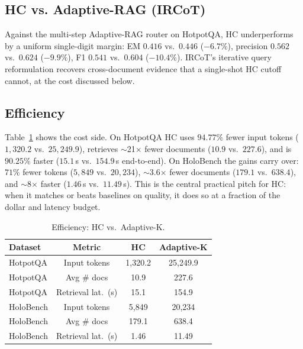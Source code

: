 \documentclass[letterpaper]{article}
\newcommand{\HotEMHC}{0.416}
\newcommand{\HotEMIRCoT}{0.446}
\newcommand{\HotPrecHC}{0.562}
\newcommand{\HotPrecIRCoT}{0.624}
\newcommand{\HotFOneHC}{0.541}
\newcommand{\HotFOneIRCoT}{0.604}
\newcommand{\HotTokHC}{1{,}320.2}
\newcommand{\HotTokAdaK}{25{,}249.9}
\newcommand{\HotDocsHC}{10.9}
\newcommand{\HotDocsAdaK}{227.6}
\newcommand{\HotLatHC}{15.1}
\newcommand{\HotLatAdaK}{154.9}
\newcommand{\HolTokHC}{5{,}849}
\newcommand{\HolTokAdaK}{20{,}234}
\newcommand{\HolDocsHC}{179.1}
\newcommand{\HolDocsAdaK}{638.4}
\newcommand{\HolLatHC}{1.46}
\newcommand{\HolLatAdaK}{11.49}
\begin{document}
\subsection{HC vs. Adaptive-RAG (IRCoT)}
Against the multi-step Adaptive-RAG router on HotpotQA, HC
underperforms by a uniform single-digit margin: EM $\HotEMHC$ vs.\
$\HotEMIRCoT$ ($-6.7\%$), precision $\HotPrecHC$ vs.\
$\HotPrecIRCoT$ ($-9.9\%$), F1 $\HotFOneHC$ vs.\ $\HotFOneIRCoT$
($-10.4\%$). IRCoT's iterative query reformulation recovers
cross-document evidence that a single-shot HC cutoff cannot, at the
cost discussed below.

\subsection{Efficiency}
Table~\ref{tab:eff} shows the cost side. On HotpotQA HC uses
$94.77\%$ fewer input tokens ($\HotTokHC$ vs.\ $\HotTokAdaK$),
retrieves $\sim$21$\times$ fewer documents ($\HotDocsHC$ vs.\
$\HotDocsAdaK$), and is $90.25\%$ faster ($\HotLatHC$\,s vs.\
$\HotLatAdaK$\,s end-to-end). On HoloBench the gains carry over:
$71\%$ fewer tokens ($\HolTokHC$ vs.\ $\HolTokAdaK$), $\sim$3.6$\times$
fewer documents ($\HolDocsHC$ vs.\ $\HolDocsAdaK$), and $\sim$8$\times$
faster ($\HolLatHC$\,s vs.\ $\HolLatAdaK$\,s). This is the central
practical pitch for HC: when it matches or beats baselines on quality,
it does so at a fraction of the dollar and latency budget.

\begin{table}[t]
\centering
\small
\begin{tabular}{lccc}
\hline
Dataset & Metric & HC & Adaptive-K \\
\hline
HotpotQA  & Input tokens     & \HotTokHC  & \HotTokAdaK \\
HotpotQA  & Avg \# docs      & \HotDocsHC & \HotDocsAdaK \\
HotpotQA  & Retrieval lat.\ (s) & \HotLatHC  & \HotLatAdaK \\
\hline
HoloBench & Input tokens     & \HolTokHC  & \HolTokAdaK \\
HoloBench & Avg \# docs      & \HolDocsHC & \HolDocsAdaK \\
HoloBench & Retrieval lat.\ (s) & \HolLatHC  & \HolLatAdaK \\
\hline
\end{tabular}
\caption{Efficiency: HC vs.\ Adaptive-K.}
\label{tab:eff}
\end{table}
\end{document}
